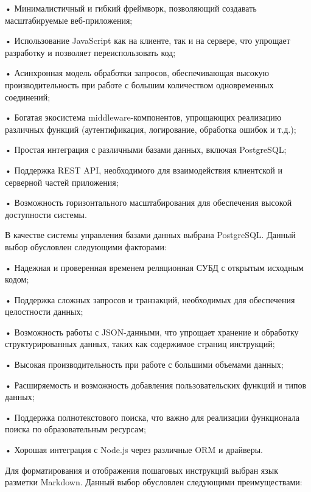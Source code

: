 {  \par \redline • Минималистичный и гибкий фреймворк, позволяющий создавать масштабируемые веб-приложения;
  \par \redline • Использование JavaScript как на клиенте, так и на сервере, что упрощает разработку и позволяет переиспользовать код;
  \par \redline • Асинхронная модель обработки запросов, обеспечивающая высокую производительность при работе с большим количеством одновременных соединений;
  \par \redline • Богатая экосистема middleware-компонентов, упрощающих реализацию различных функций (аутентификация, логирование, обработка ошибок и т.д.);
  \par \redline • Простая интеграция с различными базами данных, включая PostgreSQL;
  \par \redline • Поддержка REST API, необходимого для взаимодействия клиентской и серверной частей приложения;
  \par \redline • Возможность горизонтального масштабирования для обеспечения высокой доступности системы.

  \par \redline В качестве системы управления базами данных выбрана PostgreSQL. Данный выбор обусловлен следующими факторами:
  
  \par \redline • Надежная и проверенная временем реляционная СУБД с открытым исходным кодом;
  \par \redline • Поддержка сложных запросов и транзакций, необходимых для обеспечения целостности данных;
  \par \redline • Возможность работы с JSON-данными, что упрощает хранение и обработку структурированных данных, таких как содержимое страниц инструкций;
  \par \redline • Высокая производительность при работе с большими объемами данных;
  \par \redline • Расширяемость и возможность добавления пользовательских функций и типов данных;
  \par \redline • Поддержка полнотекстового поиска, что важно для реализации функционала поиска по образовательным ресурсам;
  \par \redline • Хорошая интеграция с Node.js через различные ORM и драйверы.

  \par \redline Для форматирования и отображения пошаговых инструкций выбран язык разметки Markdown. Данный выбор обусловлен следующими преимуществами:
  
}
